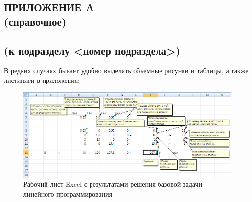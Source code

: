 \renewcommand{\thefigure}{\Asbuk{section}.\arabic{figure}}
\renewcommand{\thetable}{\Asbuk{section}.\arabic{table}}
\renewcommand{\thelstlisting}{\Asbuk{section}.\arabic{lstlisting}}

\pagestyle{fancy}
\thispagestyle{plain}

\begin{landscape}
\section*{ПРИЛОЖЕНИЕ A\\(справочное)\\<название приложения>\\(к подразделу <номер подраздела>)}

\setcounter{section}{1}
\setcounter{figure}{0}
\setcounter{table}{0}
\setcounter{lstlisting}{0}

В редких случаях бывает удобно выделять объемные рисунки и таблицы, а также листиниги в приложения:

\begin{figure}[h]
\centering
  \includegraphics[width=0.8\linewidth]{fig/excel}
  \caption{Рабочий лист Excel с результатами решения базовой задачи линейного программирования}
\end{figure}

\end{landscape}

\newpage
